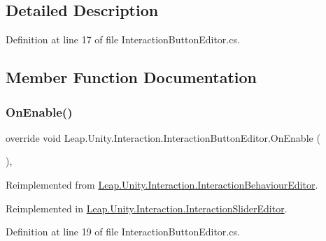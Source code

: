 \subsection{Detailed Description}


Definition at line 17 of file Interaction\+Button\+Editor.\+cs.



\subsection{Member Function Documentation}
\mbox{\label{class_leap_1_1_unity_1_1_interaction_1_1_interaction_button_editor_acabb30b7d288e4c778168cb3e9d712d7}} 
\subsubsection{\texorpdfstring{OnEnable()}{OnEnable()}}
{\footnotesize\ttfamily override void Leap.\+Unity.\+Interaction.\+Interaction\+Button\+Editor.\+On\+Enable (\begin{DoxyParamCaption}{ }\end{DoxyParamCaption})\hspace{0.3cm}{\ttfamily [protected]}, {\ttfamily [virtual]}}



Reimplemented from \mbox{\hyperlink{class_leap_1_1_unity_1_1_interaction_1_1_interaction_behaviour_editor_ab79cc92b11713942f5e3453789317297}{Leap.\+Unity.\+Interaction.\+Interaction\+Behaviour\+Editor}}.



Reimplemented in \mbox{\hyperlink{class_leap_1_1_unity_1_1_interaction_1_1_interaction_slider_editor_a01649ae644e16c97e44c6e54a40b8e30}{Leap.\+Unity.\+Interaction.\+Interaction\+Slider\+Editor}}.



Definition at line 19 of file Interaction\+Button\+Editor.\+cs.

\mbox{\label{class_leap_1_1_unity_1_1_interaction_1_1_interaction_button_editor_aef59612f9c7f92072dd7b5bc996ddcf6}} 
